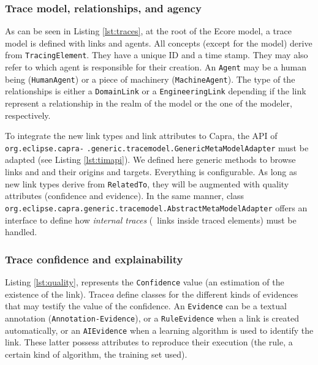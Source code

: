 \subsubsection{Trace model, relationships, and agency}
As can be seen in Listing \ref{lst:traces}, at the root of the Ecore model, a trace model is defined with links and agents. All concepts (except for the model) derive from \texttt{TracingElement}. They have a unique ID and a time stamp. They may also refer to which agent is responsible for their creation. An \texttt{Agent} may be a human being (\texttt{HumanAgent}) or a piece of machinery (\texttt{MachineAgent}).
The type of the relationships is either a \texttt{DomainLink} or a \texttt{EngineeringLink} depending if the link represent a relationship in the realm of the model or the one of the modeler, respectively. 



To integrate the new link types and link attributes to Capra, the API of  \verb|org.eclipse.capra-| \verb|.generic.tracemodel.GenericMetaModelAdapter| must be adapted (see Listing \ref{lst:timapi}). We defined here generic methods to browse  links and and their origins and targets. Everything is configurable. As long as new link types derive from \texttt{RelatedTo}, they will be augmented with quality attributes (\ie confidence and evidence).
In the same manner, class \verb|org.eclipse.capra.generic.tracemodel.AbstractMetaModelAdapter| offers an interface to define how \textit{internal traces} (\ie~links inside traced elements) must be handled. 




\subsubsection{Trace confidence and explainability}
Listing \ref{lst:quality}, represents the \texttt{Confidence} value (\ie an estimation of the existence of the link). Trace\textit{a} define classes for the different kinds of evidences that may testify the value of the confidence. An \texttt{Evidence} can be a textual annotation (\texttt{Annotation-Evidence}), or a \texttt{RuleEvidence} when a link is created automatically, or an \texttt{AIEvidence} when a learning algorithm is used to identify the link. These latter possess attributes to reproduce their execution (\eg the rule, a certain kind of algorithm, the training set used).





